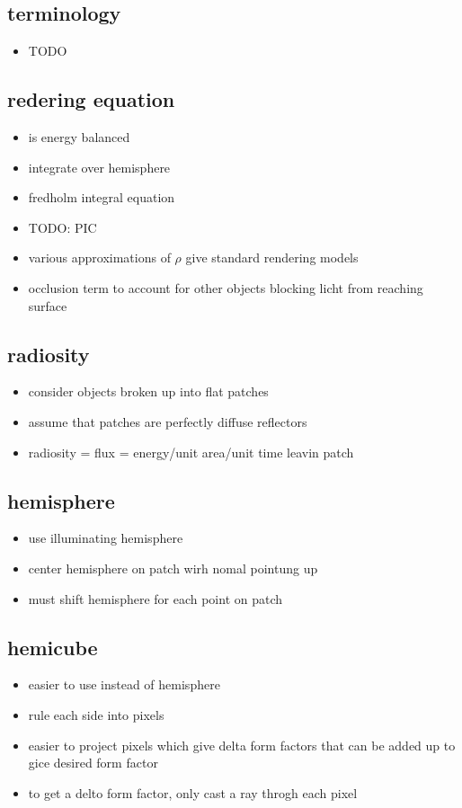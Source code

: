 \documentclass[11pt,a4paper]{article}
\begin{document}
\subsection{terminology}
\begin{itemize}
	\item TODO
\end{itemize}
\subsection{redering equation}
\begin{itemize}
	\item is energy balanced
	\item integrate over hemisphere
	\item fredholm integral equation
	\item TODO: PIC 
	\item various approximations of $\rho$ give standard rendering models
	\item occlusion term to account for other objects blocking licht from reaching surface
\end{itemize}
\subsection{radiosity}
\begin{itemize}
	\item consider objects broken up into flat patches
	\item assume that patches are perfectly diffuse reflectors
	\item radiosity = flux = energy/unit area/unit time leavin patch
\end{itemize}
\subsection{hemisphere}
\begin{itemize}
	\item use illuminating hemisphere
	\item center hemisphere on patch wirh nomal pointung up
	\item must shift hemisphere for each point on patch
\end{itemize}
\subsection{hemicube}
\begin{itemize}
	\item easier to use instead of hemisphere
	\item rule each side into pixels
	\item easier to project pixels which give delta form factors that can be added up to gice desired form factor
	\item to get a delto form factor, only cast a ray throgh each pixel
\end{itemize}
\end{document}
